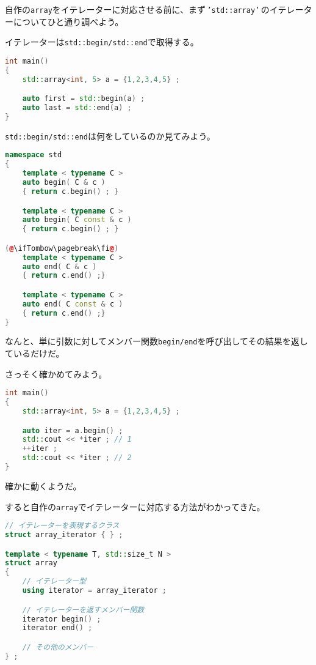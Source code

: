 

自作の\texttt{array}をイテレーターに対応させる前に、まず\,\texttt{'std::array'}\,のイテレーターについてひと通り調べよう。

イテレーターは\texttt{std::begin/std::end}で取得する。

\begin{lstlisting}[language={C++}]
int main()
{
    std::array<int, 5> a = {1,2,3,4,5} ;

    auto first = std::begin(a) ;
    auto last = std::end(a) ;
}
\end{lstlisting}

\texttt{std::begin/std::end}は何をしているのか見てみよう。

\begin{lstlisting}[language={C++}]
namespace std
{
    template < typename C >
    auto begin( C & c )
    { return c.begin() ; }

    template < typename C >
    auto begin( C const & c )
    { return c.begin() ; }

(@\ifTombow\pagebreak\fi@)
    template < typename C >
    auto end( C & c )
    { return c.end() ;}

    template < typename C >
    auto end( C const & c )
    { return c.end() ;}
}
\end{lstlisting}

なんと、単に引数に対してメンバー関数\texttt{begin/end}を呼び出してその結果を返しているだけだ。

さっそく確かめてみよう。

\begin{lstlisting}[language={C++}]
int main()
{
    std::array<int, 5> a = {1,2,3,4,5} ;

    auto iter = a.begin() ;
    std::cout << *iter ; // 1
    ++iter ;
    std::cout << *iter ; // 2
}
\end{lstlisting}

確かに動くようだ。

すると自作の\texttt{array}でイテレーターに対応する方法がわかってきた。

\begin{lstlisting}[language={C++}]
// イテレーターを表現するクラス
struct array_iterator { } ;

template < typename T, std::size_t N >
struct array
{
    // イテレーター型
    using iterator = array_iterator ;

    // イテレーターを返すメンバー関数
    iterator begin() ;
    iterator end() ;

    // その他のメンバー
} ;
\end{lstlisting}

